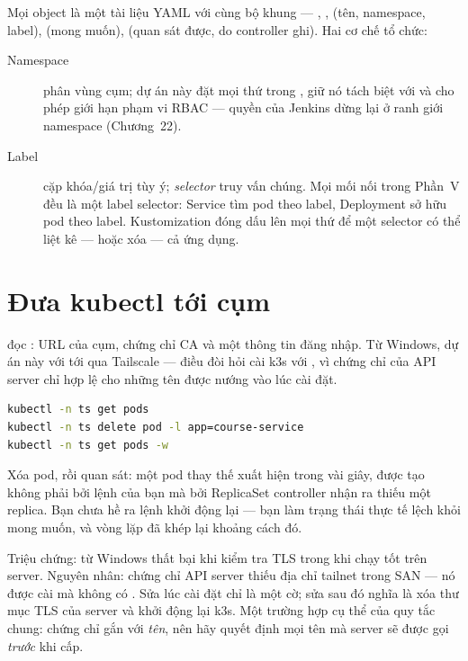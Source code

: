 Mọi object là một tài liệu YAML với cùng bộ khung --- ,
,  (tên, namespace, label),  (mong
muốn),  (quan sát được, do controller ghi). Hai cơ chế tổ
chức:

\begin{description}
  \item[Namespace] phân vùng cụm; dự án này đặt mọi thứ trong
  , giữ nó tách biệt với  và cho phép giới
  hạn phạm vi RBAC --- quyền của Jenkins dừng lại ở ranh giới namespace
  (Chương~22).
  \item[Label] cặp khóa/giá trị tùy ý; \emph{selector} truy vấn chúng.
  Mọi mối nối trong Phần~V đều là một label selector: Service tìm pod
  theo label, Deployment sở hữu pod theo label. Kustomization đóng dấu
   lên mọi thứ để
  một selector có thể liệt kê --- hoặc xóa --- cả ứng dụng.
\end{description}

\section{Đưa kubectl tới cụm}

 đọc : URL của cụm,
chứng chỉ CA và một thông tin đăng nhập. Từ Windows, dự án này với tới
 qua Tailscale --- điều đòi hỏi cài k3s
với , vì chứng chỉ của API server chỉ hợp
lệ cho những tên được nướng vào lúc cài đặt.

\begin{handson}
\begin{lstlisting}[language=bash]
kubectl -n ts get pods
kubectl -n ts delete pod -l app=course-service
kubectl -n ts get pods -w
\end{lstlisting}
Xóa pod, rồi quan sát: một pod thay thế xuất hiện trong vài giây, được
tạo không phải bởi lệnh của bạn mà bởi ReplicaSet controller nhận ra
thiếu một replica. Bạn chưa hề ra lệnh khởi động lại --- bạn làm trạng
thái thực tế lệch khỏi mong muốn, và vòng lặp đã khép lại khoảng cách
đó.
\end{handson}

\begin{pitfall}
Triệu chứng:  từ Windows thất bại khi kiểm tra TLS trong
khi chạy tốt trên server. Nguyên nhân: chứng chỉ API server thiếu địa
chỉ tailnet trong SAN --- nó được cài mà không có . Sửa
lúc cài đặt chỉ là một cờ; sửa sau đó nghĩa là xóa thư mục TLS của
server và khởi động lại k3s. Một trường hợp cụ thể của quy tắc chung:
chứng chỉ gắn với \emph{tên}, nên hãy quyết định mọi tên mà server sẽ
được gọi \emph{trước} khi cấp.
\end{pitfall}

